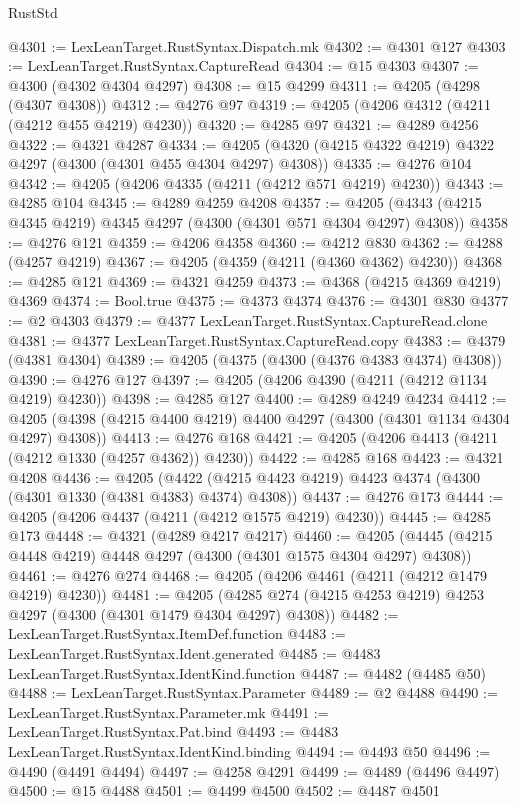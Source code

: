 \begin{lexlean}{RustStd}
\begin{coremodule}
@4301 := LexLeanTarget.RustSyntax.Dispatch.mk
@4302 := @4301 @127
@4303 := LexLeanTarget.RustSyntax.CaptureRead
@4304 := @15 @4303
@4307 := @4300 (@4302 @4304 @4297)
@4308 := @15 @4299
@4311 := @4205 (@4298 (@4307 @4308))
@4312 := @4276 @97
@4319 := @4205 (@4206 @4312 (@4211 (@4212 @455 @4219) @4230))
@4320 := @4285 @97
@4321 := @4289 @4256
@4322 := @4321 @4287
@4334 := @4205 (@4320 (@4215 @4322 @4219) @4322 @4297 (@4300 (@4301 @455 @4304 @4297) @4308))
@4335 := @4276 @104
@4342 := @4205 (@4206 @4335 (@4211 (@4212 @571 @4219) @4230))
@4343 := @4285 @104
@4345 := @4289 @4259 @4208
@4357 := @4205 (@4343 (@4215 @4345 @4219) @4345 @4297 (@4300 (@4301 @571 @4304 @4297) @4308))
@4358 := @4276 @121
@4359 := @4206 @4358
@4360 := @4212 @830
@4362 := @4288 (@4257 @4219)
@4367 := @4205 (@4359 (@4211 (@4360 @4362) @4230))
@4368 := @4285 @121
@4369 := @4321 @4259
@4373 := @4368 (@4215 @4369 @4219) @4369
@4374 := Bool.true
@4375 := @4373 @4374
@4376 := @4301 @830
@4377 := @2 @4303
@4379 := @4377 LexLeanTarget.RustSyntax.CaptureRead.clone
@4381 := @4377 LexLeanTarget.RustSyntax.CaptureRead.copy
@4383 := @4379 (@4381 @4304)
@4389 := @4205 (@4375 (@4300 (@4376 @4383 @4374) @4308))
@4390 := @4276 @127
@4397 := @4205 (@4206 @4390 (@4211 (@4212 @1134 @4219) @4230))
@4398 := @4285 @127
@4400 := @4289 @4249 @4234
@4412 := @4205 (@4398 (@4215 @4400 @4219) @4400 @4297 (@4300 (@4301 @1134 @4304 @4297) @4308))
@4413 := @4276 @168
@4421 := @4205 (@4206 @4413 (@4211 (@4212 @1330 (@4257 @4362)) @4230))
@4422 := @4285 @168
@4423 := @4321 @4208
@4436 := @4205
    (@4422 (@4215 @4423 @4219) @4423 @4374 (@4300 (@4301 @1330 (@4381 @4383) @4374) @4308))
@4437 := @4276 @173
@4444 := @4205 (@4206 @4437 (@4211 (@4212 @1575 @4219) @4230))
@4445 := @4285 @173
@4448 := @4321 (@4289 @4217 @4217)
@4460 := @4205 (@4445 (@4215 @4448 @4219) @4448 @4297 (@4300 (@4301 @1575 @4304 @4297) @4308))
@4461 := @4276 @274
@4468 := @4205 (@4206 @4461 (@4211 (@4212 @1479 @4219) @4230))
@4481 := @4205 (@4285 @274 (@4215 @4253 @4219) @4253 @4297 (@4300 (@4301 @1479 @4304 @4297) @4308))
@4482 := LexLeanTarget.RustSyntax.ItemDef.function
@4483 := LexLeanTarget.RustSyntax.Ident.generated
@4485 := @4483 LexLeanTarget.RustSyntax.IdentKind.function
@4487 := @4482 (@4485 @50)
@4488 := LexLeanTarget.RustSyntax.Parameter
@4489 := @2 @4488
@4490 := LexLeanTarget.RustSyntax.Parameter.mk
@4491 := LexLeanTarget.RustSyntax.Pat.bind
@4493 := @4483 LexLeanTarget.RustSyntax.IdentKind.binding
@4494 := @4493 @50
@4496 := @4490 (@4491 @4494)
@4497 := @4258 @4291
@4499 := @4489 (@4496 @4497)
@4500 := @15 @4488
@4501 := @4499 @4500
@4502 := @4487 @4501

\end{coremodule}
\end{lexlean}
